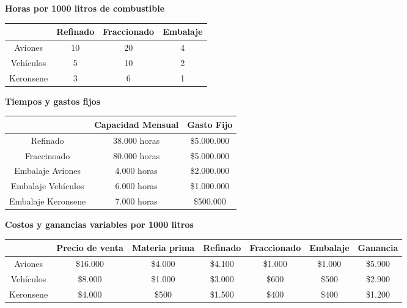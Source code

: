 \documentclass[10pt,a4paper]{article}
\begin{document}
\begin{center}
\textbf{Horas por 1000 litros de combustible}

\begin{tabular}{| c || c | c | c |}
	\hline
						& Refinado & Fraccionado & Embalaje \\
	\hline
	Aviones   & 10       & 20          & 4 \\
	\hline
	Vehículos & 5        & 10          & 2 \\
	\hline
	Keronsene & 3        & 6           & 1 \\
	\hline
\end{tabular}

\vspace{5mm}
\textbf{Tiempos y gastos fijos}

\begin{tabular}{| c || c | c |}
	\hline
										& Capacidad Mensual & Gasto Fijo \\
	\hline
	Refinado           & 38.000 horas      & \$5.000.000 \\
	\hline
	Fraccinoado        & 80.000 horas      & \$5.000.000 \\
	\hline
	Embalaje Aviones   & 4.000 horas       & \$2.000.000 \\
	\hline
	Embalaje Vehículos & 6.000 horas       & \$1.000.000 \\
	\hline
	Embalaje Keronsene & 7.000 horas       & \$500.000 \\
	\hline
\end{tabular}

\vspace{5mm}

	\textbf{Costos y ganancias variables por 1000 litros}

	\begin{tabular}{| c || c | c | c | c | c | c|}
		\hline
							& Precio de venta & Materia prima & Refinado & Fraccionado & Embalaje &
							Ganancia\\
		\hline
		Aviones   & \$16.000        & \$4.000       & \$4.100  & \$1.000   & \$1.000  & \$5.900 \\
		\hline
		Vehículos & \$8.000         & \$1.000       & \$3.000  & \$600     & \$500 & \$2.900 \\
		\hline
		Keronsene & \$4.000         & \$500         & \$1.500  & \$400     & \$400  & \$1.200 \\
		\hline
	\end{tabular}
\end{center}
\end{document}
